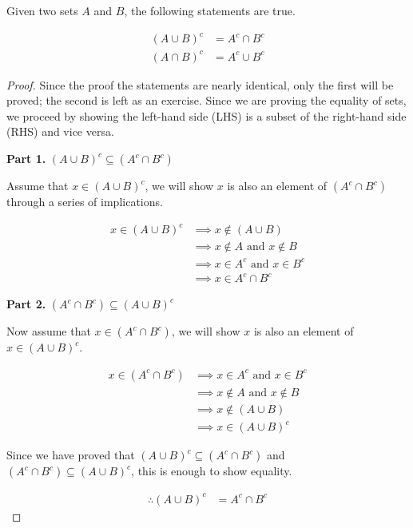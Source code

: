 \documentclass[twoside]{report}
\newcommand{\header}[2]{\begin{flushright} \textbf{#1} #2 \end{flushright}}
\begin{document}
\begin{theorem}
	Given two sets $A$ and $B$, the following statements are true.
	
	\begin{align}
		(A \cup B)^c &= A^c \cap B^c \\
		(A \cap B)^c &= A^c \cup B^c
	\end{align}
\end{theorem}

\begin{proof}
	Since the proof the statements are nearly identical, only the first will be proved; the second is left as an exercise. Since we are proving the equality of sets, we proceed by showing the left-hand side (LHS) is a subset of the right-hand side (RHS) and vice versa.
	
	\header{Part 1.}{$(A \cup B)^c \subseteq (A^c \cap B^c)$}
	
	Assume that $x \in (A \cup B)^c$, we will show $x$ is also an element of $(A^c \cap B^c)$ through a series of implications.
	
	\begin{align*}
		x \in (A \cup B)^c &\implies x \notin (A \cup B) \\
		&\implies x \notin A \text{ and } x \notin B \\
		&\implies x \in A^c \text{ and } x \in B^c \\
		&\implies x \in A^c \cap B^c
	\end{align*}
		
	\header{Part 2.}{$(A^c \cap B^c) \subseteq (A \cup B)^c$}
	
	Now assume that $x \in (A^c \cap B^c)$, we will show $x$ is also an element of $x \in (A \cup B)^c$.
	
	\begin{align*}
		x \in (A^c \cap B^c) &\implies x \in A^c \text{ and } x \in B^c \\
		&\implies x \notin A \text{ and } x \notin B \\
		&\implies x \notin (A \cup B) \\
		&\implies x \in (A \cup B)^c
	\end{align*}
	
	Since we have proved that $(A \cup B)^c \subseteq (A^c \cap B^c)$ and $(A^c \cap B^c) \subseteq (A \cup B)^c$, this is enough to show equality.
	
	\begin{align*}
		\therefore (A \cup B)^c &= A^c \cap B^c
	\end{align*}
\end{proof}
\vspace{\baselineskip}
\end{document}
